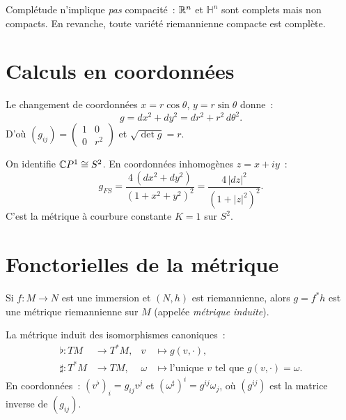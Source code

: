 \begin{attention}[title=\textbf{Compl\'etude et compacit\'e}]
Compl\'etude n'implique \emph{pas} compacit\'e~: $\mathbb{R}^n$ et $\mathbb{H}^n$ sont complets
mais non compacts. En revanche, toute vari\'et\'e riemannienne compacte est compl\`ete.
\end{attention}

\section{Calculs en coordonn\'ees}

\begin{exemple}
Le changement de coordonn\'ees $x = r\cos\theta$, $y = r\sin\theta$ donne~:
\[
    g = dx^2 + dy^2 = dr^2 + r^2\, d\theta^2.
\]
D'o\`u $(g_{ij}) = \begin{pmatrix} 1 & 0 \\ 0 & r^2 \end{pmatrix}$ et
$\sqrt{\det g} = r$.
\end{exemple}

\begin{exemple}
On identifie $\mathbb{C} P^1 \cong S^2$. En coordonn\'ees inhomog\`enes $z = x + iy$~:
\[
    g_{FS} = \frac{4\,(dx^2 + dy^2)}{(1 + x^2 + y^2)^2}
    = \frac{4\, |dz|^2}{(1 + |z|^2)^2}.
\]
C'est la m\'etrique \`a courbure constante $K = 1$ sur $S^2$.
\end{exemple}

\section{Fonctorielles de la m\'etrique}

\begin{proposition}
Si $f : M \to N$ est une immersion et $(N, h)$ est riemannienne, alors
$g = f^* h$ est une m\'etrique riemannienne sur $M$ (appel\'ee \emph{m\'etrique induite}).
\end{proposition}

\begin{proposition}
La m\'etrique induit des isomorphismes canoniques~:
\begin{align*}
    \flat : TM &\to T^*M, & v &\mapsto g(v, \cdot), \\
    \sharp : T^*M &\to TM, & \omega &\mapsto \text{l'unique } v \text{ tel que }
    g(v, \cdot) = \omega.
\end{align*}
En coordonn\'ees~: $(v^\flat)_i = g_{ij} v^j$ et $(\omega^\sharp)^i = g^{ij} \omega_j$,
o\`u $(g^{ij})$ est la matrice inverse de $(g_{ij})$.
\end{proposition}

